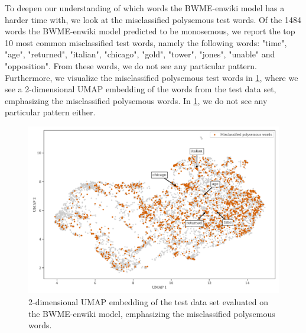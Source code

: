 To deepen our understanding of which words the BWME-enwiki model has a harder time with, we look at the misclassified polysemous test words. Of the 1484 words the BWME-enwiki model predicted to be monosemous, we report the top 10 most common misclassified test words, namely the following words: "time", "age", "returned", "italian", "chicago", "gold", "tower", "jones", "unable" and "opposition". From these words, we do not see any particular pattern. Furthermore, we visualize the misclassified polysemous test words in \cref{fig:bwme-enwiki-umap-misclassified-polysemous-words}, where we see a 2-dimensional UMAP embedding of the words from the test data set, emphasizing the misclassified polysemous words. In \cref{fig:bwme-enwiki-umap-misclassified-polysemous-words}, we do not see any particular pattern either.
\begin{figure}[H]
    \centering
    \includegraphics[width=\textwidth]{thesis/figures/bwme-enwiki-umap-misclassified-polysemous-words.pdf}
    \caption{2-dimensional UMAP embedding of the test data set evaluated on the BWME-enwiki model, emphasizing the misclassified polysemous words.}
    \label{fig:bwme-enwiki-umap-misclassified-polysemous-words}
\end{figure}

